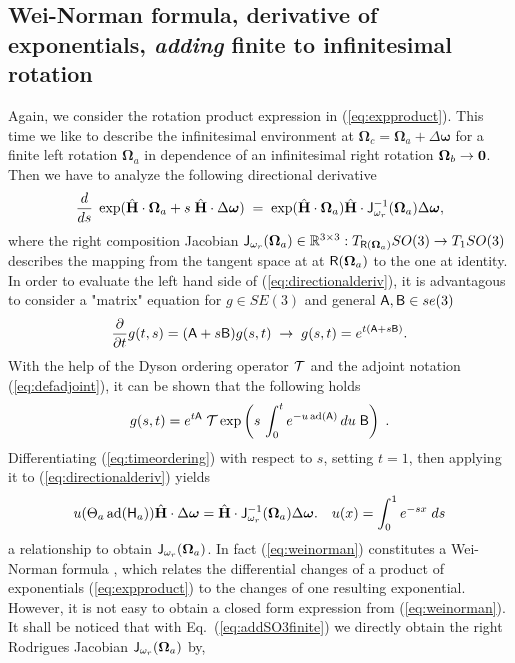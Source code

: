 \documentclass[conference]{IEEEtran}
\newcommand{\real}{\Bbb R}
\newcommand{\bfomega}{\boldsymbol{\omega}}
\newcommand{\bfOmega}{\boldsymbol{\Omega}}
\newcommand{\adj}[1]{\mathrm{ad}({#1})}
\newcommand{\beq}{\begin{equation}}
\newcommand{\eeq}{\end{equation}}
\begin{document}
\begin{appendix}
\subsection{Wei-Norman formula, derivative of exponentials, {\em adding} finite to infinitesimal rotation}
\label{app:weinorman}
Again, we consider the rotation product expression in (\ref{eq:expproduct}). This time we
like to describe the infinitesimal environment at $\bfOmega_c = \bfOmega_a + \Delta\bfomega$
for a finite left rotation $\bfOmega_a$ in dependence of an infinitesimal right rotation $\bfOmega_b \rightarrow \bf 0$.
Then we have to analyze the following directional derivative
\beq
    {d\over ds}\;\exp(\hat{\bf H}\cdot\bfOmega_a + s\;\hat{\bf H}\cdot\Delta\bfomega)
    \; = \; \exp(\hat{\bf H}\cdot\bfOmega_a) \hat{\bf H}\cdot{\sf J}_{\omega_r}^{-1}(\bfOmega_a)
    \Delta\bfomega,
    \label{eq:directionalderiv}
\eeq
where the right composition Jacobian ${\sf J}_{\omega_r}(\bfOmega_a) \in \real^{3\times3}: 
T_{{\sf R}(\bfOmega_a)}SO(3)\rightarrow T_1SO(3)$ describes the
mapping from the tangent space at at ${\sf R}(\bfOmega_a)$ to the one at identity.
In order to evaluate the left hand side of (\ref{eq:directionalderiv}), it is advantagous to
consider a "matrix" equation for $g\in SE(3)$ and general ${\sf A},{\sf B}\in se(3)$
\beq
    {\partial \over \partial t}g(t,s) = ({\sf A} + s{\sf B})g(s,t)\; \rightarrow \;
    g(s,t) = e^{t ({\sf A}+s{\sf B})}. \label{eq:SE3diff}
\eeq
With the help of the Dyson ordering operator ${\cal T}$ 
and the adjoint notation (\ref{eq:defadjoint}), it can be shown that the following holds
\beq
    g(s,t) = e^{t {\sf A}} \; {\cal T}\exp\left( s\,
    \int_0^t e^{-u\, \adj{\sf A}} \, du \; {\sf B} \right ) \; .
    \label{eq:timeordering}
\eeq
Differentiating (\ref{eq:timeordering}) with respect to $s$, setting $t=1$,
then applying it to (\ref{eq:directionalderiv}) yields
\beq
    u(\Theta_a\, \adj{{\sf H}_a} )
    \hat{\bf H}\cdot\Delta\bfomega = \hat{\bf H}\cdot {\sf J}_{\omega_r}^{-1}(\bfOmega_a)
    \Delta\bfomega. \quad u(x)=\int_0^1 e^{-s x} \; ds
    \label{eq:weinorman}
\eeq
a relationship to obtain ${\sf J}_{\omega_r}(\bfOmega_a)$. In fact (\ref{eq:weinorman}) constitutes a
Wei-Norman formula \cite{Wei-Norman}, which relates the differential changes of a product of
exponentials (\ref{eq:expproduct}) to the changes of one resulting exponential. However, it is not easy
to obtain a closed form expression from (\ref{eq:weinorman}). It shall be noticed that with Eq.~(\ref{eq:addSO3finite})
we directly obtain the right Rodrigues Jacobian ${\sf J}_{\omega_r}(\bfOmega_a)$ by,

\end{appendix}
\end{document}
